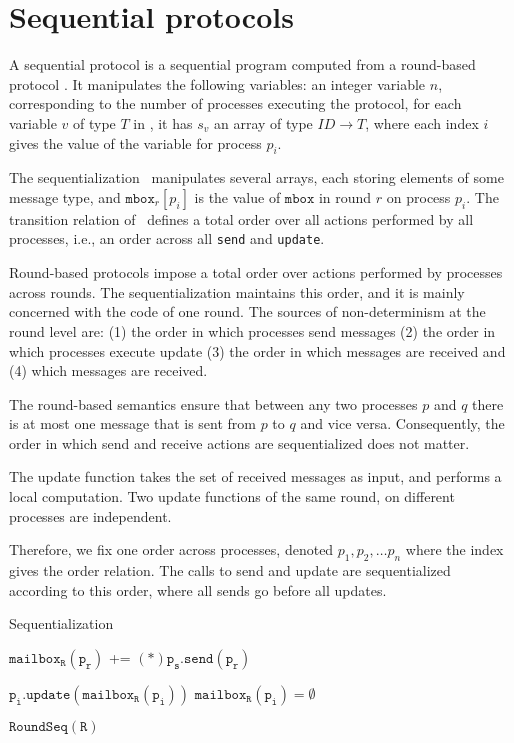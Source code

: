 \section{Sequential protocols}
\label{preliminaries:sequential}

A sequential protocol is a sequential program computed from a round-based protocol \Psync. It manipulates the following variables: an integer variable $n$, corresponding to the number of processes executing the protocol, for each variable $v$ of type $T$ in \Psync, it has $s_v$ an array of type $\mathit{ID} \rightarrow T$, where each index $i$ gives the value of the variable for process $p_i$.

The sequentialization \Pseq\ manipulates several arrays, each storing elements of some message type, and $\texttt{mbox}_{r}[p_i]$ is the value of $\texttt{mbox}$ in round $r$ on process $p_i$. 
The transition relation of \Pseq\ defines a total order over all actions performed by all processes, i.e., an order across all \texttt{send} and \texttt{update}.

Round-based protocols impose a total order over actions performed by processes across rounds. 
The sequentialization maintains this order, and it is mainly concerned with the code of one round. 
The sources of non-determinism at the round level are: 
(1) the order in which processes send messages 
(2) the order in which processes execute update 
(3) the order in which messages are received and
(4) which messages are received. 

The round-based semantics ensure that between any two processes $p$ and $q$ there is at most one message that is sent from $p$ to $q$ and vice versa.  
Consequently, the order in which send and receive actions are sequentialized does not matter. 

The update function takes the set of received messages as input, and performs a local computation. Two update functions of the same round, on different processes are independent.

Therefore, we fix one order across processes, denoted  $p_1, p_2, \ldots p_n$ where the index gives the order relation.
The calls to send and update are sequentialized according to this order, where all sends go before all updates. 

\begin{algorithm}[H]
\caption{Sequentialization}
\begin{algorithmic}[1]
\scriptsize

 
        \State $\mathtt{mailbox_R(p_r)}$ += $\mathtt{(*)p_s.send(p_r)}$ \label{algorithm:sequentialization:choose}
    \EndFor
\EndFor

    \State $\mathtt{p_i.update(mailbox_R(p_i))}$
    \State $\mathtt{mailbox_R(p_i)=\emptyset}$
\EndFor

 
        \State $\mathtt{RoundSeq(R)}$
    \EndFor
\EndWhile
\end{algorithmic}
\label{algorithm:sequentialization}
\end{algorithm}

